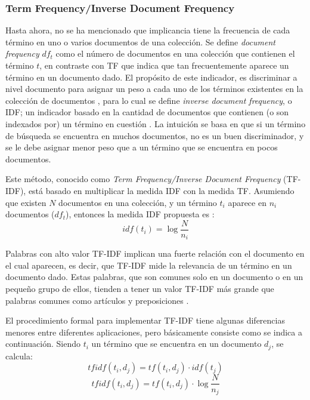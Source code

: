 \subsubsection{Term Frequency/Inverse Document Frequency}
Hasta ahora, no se ha mencionado que implicancia tiene la frecuencia de cada término en uno o varios documentos de una colección. Se define \textit{document frequency} \(df_t\) como el número de documentos en una colección que contienen el término \(t\), en contraste con TF que indica que tan frecuentemente aparece un término en un documento dado. El propósito de este indicador, es discriminar a nivel documento para asignar un peso a cada uno de los términos existentes en la colección de documentos \citep{christopher2008introduction}, para lo cual se define \textit{inverse document frequency}, o IDF; un indicador basado en la cantidad de documentos que contienen (o son indexados por) un término en cuestión \citep{robertson2004understanding}. La intuición se basa en que si un término de búsqueda se encuentra en muchos documentos, no es un buen discriminador, y se le debe asignar menor peso que a un término que se encuentra en pocos documentos.

\bigskip Este método, conocido como \textit{Term Frequency/Inverse Document Frequency} (TF-IDF), está basado en multiplicar la medida IDF con la medida TF. Asumiendo que existen \(N\) documentos en una colección, y un término \(t_i\) aparece en \(n_i\) documentos (\(df_t\)), entonces la medida IDF propuesta es \citep{sparck1972statistical}:
\[idf(t_i) = \log{\frac{N}{n_i}}\]

Palabras con alto valor TF-IDF implican una fuerte relación con el documento en el cual aparecen, es decir, que TF-IDF mide la relevancia de un término en un documento dado. Estas palabras, que son comunes solo en un documento o en un pequeño grupo de ellos, tienden a tener un valor TF-IDF más grande que palabras comunes como artículos y preposiciones \citep{ramos2003using}.

\bigskip El procedimiento formal para implementar TF-IDF tiene algunas diferencias menores entre diferentes aplicaciones, pero básicamente consiste como se indica a continuación. Siendo \(t_i\) un término que se encuentra en un documento \(d_j\), se calcula:
\[tfidf(t_i, d_j) = tf(t_i, d_j) \cdot idf(t_j)\]
\[tfidf(t_i, d_j) = tf(t_i, d_j) \cdot \log{\frac{N}{n_j}}\]


